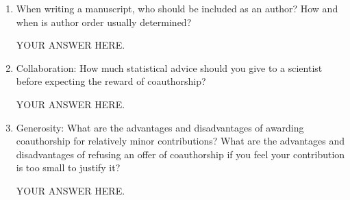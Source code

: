 \documentclass[12pt]{article}
\begin{document}
\begin{enumerate}
\item When writing a manuscript, who should be included as an author? How and when is author order usually determined? 

YOUR ANSWER HERE.

\item Collaboration: How much statistical advice should you give to a scientist before expecting the reward of coauthorship?

YOUR ANSWER HERE.

\item Generosity: What are the advantages and disadvantages of awarding coauthorship for relatively minor contributions? What are the advantages and disadvantages of refusing an offer of coauthorship if you feel your contribution is too small to justify it?

YOUR ANSWER HERE.

\end{enumerate}
\end{document}
